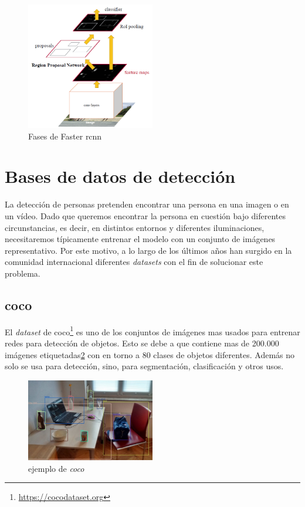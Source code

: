 \begin{figure}[H]
  \begin{center}
    \includegraphics[width=0.5\textwidth]{figures/estado_arte/faster_rcnn.png}
		\caption{Fases de Faster \acrshort{rcnn}}
		\label{fig.fast_rcnn}
		\end{center}
\end{figure}

\section{Bases de datos de detección}
La detección de personas pretenden encontrar una persona en una imagen o en un vídeo. Dado que queremos encontrar la persona en cuestión bajo diferentes circunstancias, es decir, en distintos entornos y diferentes iluminaciones, necesitaremos típicamente entrenar el modelo con un conjunto de imágenes representativo. Por este motivo, a lo largo de los últimos años han surgido en la comunidad internacional diferentes \textit{datasets} con el fin de solucionar este problema.

\subsection{\acrfull{coco}}
El \textit{dataset} de \acrfull{coco}\footnote{\url{https://cocodataset.org}}\cite{cocodataset} es uno de los conjuntos de imágenes mas usados para entrenar redes para detección de objetos. Esto se debe a que contiene mas de 200.000 imágenes etiquetadas\ref{fig.coco} con en torno a 80 clases de objetos diferentes. Además no solo se usa para detección, sino, para segmentación, clasificación y otros usos.

\begin{figure}[H]
  \begin{center}
    \includegraphics[width=0.5\textwidth]{figures/estado_arte/coco.jpeg}
		\caption{ejemplo de \textit{\acrshort{coco}}}
		\label{fig.coco}
		\end{center}
\end{figure}

